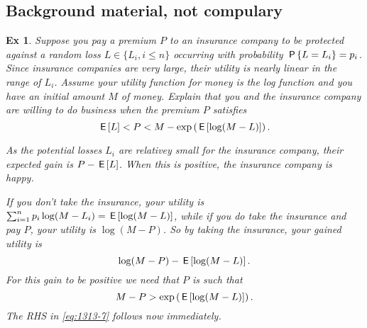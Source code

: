 \documentclass[a4paper,11pt]{article}
\newtheorem{exercise}[theorem]{Ex}
\begin{document}
\subsection{Background material, not compulary}
\label{sec:backgr-mater-not}


\begin{exercise}
Suppose you pay a premium $P$ to an insurance company to be protected against a random loss $L \in \{L_{i}, i \leq n\}$ occurring with probability $\P{L = L_{i}} = p_{i}$.
Since insurance companies are very large, their utility is nearly linear in the range of $L_{i}$.
Assume your utility function for money is the log function and you have an initial amount $M$ of money.
Explain that you and the insurance company are willing to do business when the premium $P$ satisfies
\begin{equation}
  \label{eq:1313-7}
\E L < P <   M - \exp\left(\E{\log (M-L)}\right).
\end{equation}
\begin{solution}

As the potential losses $L_{i}$ are relativey small for  the insurance company, their expected gain is $P-\E L$. When this is positive, the insurance company is happy.

If you don't take the insurance, your utility is  $\sum_{i=1}^{n} p_{i} \log (M-L_{i}) = \E{\log(M-L)}$, while if you do take the insurance and pay $P$, your utility is $\log(M-P)$. So by taking the insurance, your gained utility is
\begin{equation}
  \label{eq:138}
\log(M-P) - \E{\log(M-L)}.
\end{equation}
For this gain to be  positive we need that $P$ is such that
\begin{equation}
  \label{eq:139}
M-P > \exp\left(\E{\log(M-L)}\right).
\end{equation}
The RHS in \cref{eq:1313-7} follows now immediately.
\end{solution}
\end{exercise}
\end{document}

